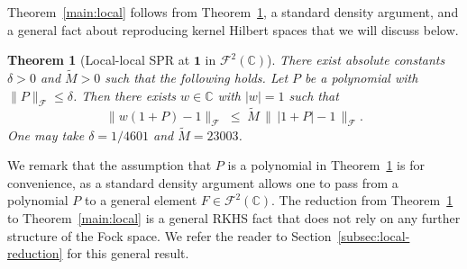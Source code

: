 \documentclass[11pt]{amsart}
\newtheorem{theorem}{Theorem}[section]
\theoremstyle{remark}
\begin{document}
Theorem~\ref{main:local} follows from Theorem~\ref{thm:local}, a standard density argument, and a general fact about reproducing kernel Hilbert spaces that we will discuss below. 
\begin{theorem}[Local-local SPR at $\mathbf{1}$ in $\mathcal{F}^2(\mathbb{C})$]\label{thm:local}
There exist absolute constants $\delta > 0$ and $\widetilde{M} > 0$ such
that the following holds.  Let $P$ be a polynomial with
$\lVert P \rVert_{\mathcal{F}} \le \delta$.  Then there exists $w \in \mathbb{C}$ with $\lvert w \rvert = 1$
such that
\[
\lVert w(1+P) - 1 \rVert_{\mathcal{F}}
\;\le\;
\widetilde{M}\,
\bigl\|\, \lvert 1+P \rvert - 1 \,\bigr\|_{\mathcal{F}}.
\]
One may take $\delta = 1/4601$ and $\widetilde{M} = 23003$.
\end{theorem}
We remark that the assumption that $P$ is a polynomial in Theorem~\ref{thm:local} is for convenience, as a standard density argument allows one to pass from a polynomial $P$ to a general element $F\in \mathcal{F}^2(\mathbb{C})$. The reduction from Theorem~\ref{thm:local} to Theorem~\ref{main:local} is a general RKHS fact that does not rely on any further structure of the Fock space. We refer the reader to Section~\ref{subsec:local-reduction} for this general result.
 \vspace{0.5em}
\end{document}
